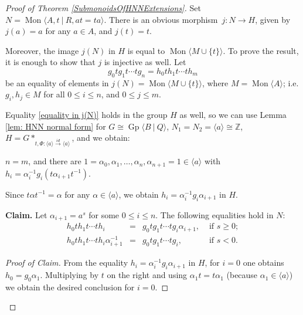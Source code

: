 \documentclass{amsart}
\newcommand{\Mpres}[2]{\operatorname{Mon}\bigl\langle #1\:|\:#2 \bigr\rangle}
\newcommand{\Mgen}[1]{\operatorname{Mon}\bigl\langle #1 \bigr\rangle}
\newcommand{\Gpres}[2]{\operatorname{Gp}\bigl\langle #1\:|\:#2 \bigr\rangle}
\newcommand{\Z}{\mathbb{Z}}
\theoremstyle{plain}
\theoremstyle{definition}
\begin{document}
\begin{proof}[Proof of Theorem \ref{SubmonoidsOfHNNExtensions}]

Set $N =  \Mpres{A,t}{R, at=ta}$. There is an obvious morphism~$j\colon N \rightarrow H$, given by $j(a) = a$ for any $a \in A$, and $j(t) = t$. 

Moreover, the image $j(N)$ in $H$ is equal to $\Mgen{M \cup \{ t \}}$. To prove the result, it is enough to show that $j$ is injective as well. Let 
\begin{equation}\label{equality in j(N)}
g_0 t g_1 t \cdots t g_n = h_0 t h_1 t \cdots t h_m
\end{equation}
be an equality of elements in $j(N) = \Mgen{M \cup \{ t \}}$, where $M = \Mgen{A}$; i.e. $g_i, h_j \in M$ for all $0 \leq i \leq n$, and $0 \leq j \leq m$. 





Equality \eqref{equality in j(N)} holds in the group $H$ as well, so we can use Lemma \ref{lem: HNN normal form} for $G \cong \Gpres{B}{Q}$, $N_1 = N_2 = \langle a \rangle \cong \Z$, $H = G*_{t, \Phi: \langle a \rangle \overset{id}{\longrightarrow} \langle a \rangle}$, and we obtain: 
\begin{center}
$n = m$, and there are $1 = \alpha_0, \alpha_1, \ldots, \alpha_n, \alpha_{n+1} = 1 \in \langle a \rangle$ with $h_i = \alpha_i^{-1} g_i (t \alpha_{i+1}t^{-1})$.
\end{center}
Since $t \alpha t^{-1} = \alpha$ for any $\alpha \in \langle a \rangle$, we obtain $h_i = \alpha_i^{-1} g_i \alpha_{i+1}$ in $H$.
















{\bf Claim.}
Let $\alpha_{i+1} = a^s$ for some $0 \leq i \leq n$. The following equalities hold in $N$:
\[
\begin{array}{lcll}
h_0 t h_1 t \cdots t h_i & = & g_0 t g_1 t \cdots t g_i \alpha_{i+1}, & \text{ if $s \geq 0$}; \\
h_0 t h_1 t \cdots t h_i \alpha_{i+1}^{-1} & = & g_0 t g_1 t \cdots t g_i, & \text{ if $s < 0$}.
\end{array}
\]


\begin{proof}[Proof of Claim]
From the equality $h_i = \alpha_i^{-1} g_i \alpha_{i+1}$ in $H$, for $i=0$ one obtains $h_0 = g_0 \alpha_1$. Multiplying by $t$ on the right and using $\alpha_1 t = t \alpha_1$ (because $\alpha_1 \in \langle a \rangle$) we obtain the desired conclusion for $i = 0$.


\end{proof}
\end{proof}
\end{document}
